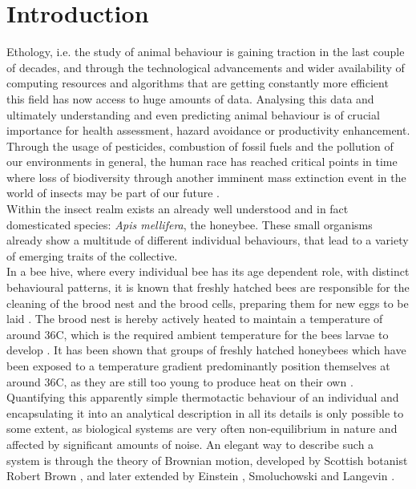 \chapter{Introduction}

Ethology, i.e. the study of animal behaviour is gaining traction in the last couple of decades, and through the technological advancements and wider availability of computing resources and algorithms that are getting constantly more efficient this field has now access to huge amounts of data.
Analysing this data and ultimately understanding and even predicting animal behaviour is of crucial importance for  health assessment, hazard avoidance or productivity enhancement.
Through the usage of pesticides, combustion of fossil fuels and the pollution of our environments in general, the human race has reached critical points in time where loss of biodiversity through another imminent mass extinction event in the world of insects may be part of our future \cite{Schachat2020} \cite{mengoni2018}.
\\
Within the insect realm exists an already well understood and in fact domesticated species: \textit{Apis mellifera}, the honeybee.
These small organisms already show a multitude of different individual behaviours, that lead to a variety of emerging traits of the collective. \cite{szopek2013} \cite{radspieler2009} \cite{schmickl2007}
\\
In a bee hive, where every individual bee has its age dependent role, with distinct behavioural patterns, it is known that freshly hatched bees are responsible for the cleaning of the brood nest and the brood cells, preparing them for new eggs to be laid \cite{baracchi2014}.
The brood nest is hereby actively heated to maintain a temperature of around 36\textdegree C, which is the required ambient temperature for the bees larvae to develop \cite{petz2004}. 
It has been shown that groups of freshly hatched honeybees which have been exposed to a temperature gradient predominantly position themselves at around 36\textdegree C, as they are still too young to produce heat on their own \cite{heran1952}.
\\
Quantifying this apparently simple thermotactic behaviour of an individual and encapsulating it into an analytical description in all its details is only possible to some extent, as biological systems are very often non-equilibrium in nature and affected by significant amounts of noise. An elegant way to describe such a system is through the theory of Brownian motion, developed by Scottish botanist Robert Brown \cite{Brown1827}, and later extended by Einstein \cite{Einstein1905}, Smoluchowski \cite{Smoluchowski1924} and Langevin \cite{Langevin1908}.
